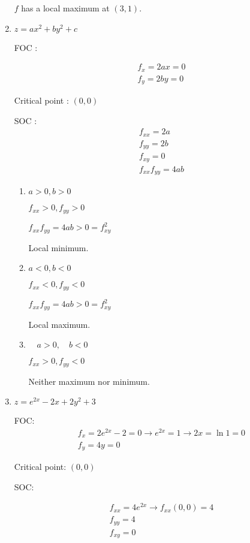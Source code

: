 \documentclass{./../../Latex/homework}
\begin{document}
\begin{enumerate}
$f$ has a local maximum at $(3,1)$. \\

\item $z=a x^{2}+b y^{2}+c$

FOC :

$$
\begin{aligned}
&f_{x}=2 a x=0 \\
&f_{y}=2 b y=0
\end{aligned}
$$

Critical point : $(0,0)$ 

SOC :
$$
\begin{aligned}
&f_{x x}=2 a \\
&f_{y y}=2 b \\
&f_{x y}=0 \\
&f_{x x} f_{y y}=4 a b
\end{aligned}
$$
\begin{enumerate}
\item $a>0, b>0$

$f_{x x}>0, f_{y y}>0$

$f_{x x} f_{y y}=4 a b>0=f^{2}_{x y}$

Local minimum. \\

\item $a<0, b<0$

$f_{x x}<0, f_{y y}<0$

$f_{x x} f_{y y}=4 a b>0=f^{2}_{x y}$

Local maximum. \\

\item $\quad a>0, \quad b<0$

$f_{x x}>0, f_{y y}<0$

Neither maximum nor minimum. \\
\end{enumerate}

\item $z=e^{2 x}-2 x+2 y^{2}+3$

FOC: 
$$
\begin{aligned}
&f_{x}=2 e^{2 x}-2=0 \rightarrow e^{2 x}=1 \rightarrow 2 x=\ln 1=0 \\
&f_{y}=4 y=0
\end{aligned}
$$

Critical point: $(0,0)$

SOC:

$$
\begin{aligned}
&f_{x x}=4 e^{2 x} \rightarrow f_{x x}(0,0)=4 \\
&f_{y y}=4 \\
&f_{x y}=0
\end{aligned}
$$


\end{enumerate}
\end{document}
